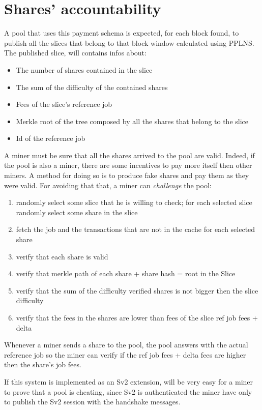 \documentclass[11pt]{article}
\begin{document}
\section{Shares' accountability}
A pool that uses this payment schema is expected, for each block found, to publish all the slices
that belong to that block window calculated using PPLNS. The published slice, will contains infos
about:
\begin{itemize}
	\item The number of shares contained in the slice
	\item The sum of the difficulty of the contained shares
	\item Fees of the slice's reference job
	\item Merkle root of the tree composed by all the shares that belong to the slice
	\item Id of the reference job
\end{itemize}
A miner must be sure that all the shares arrived to the pool are valid. Indeed, if the pool is also a miner, there are some incentives to pay more itself then other miners. A method for doing so is to produce fake shares and pay them as they were valid. For avoiding that that, a miner can \emph{challenge} the pool:
\begin{enumerate}
	\item randomly select some slice that he is willing to check; for each selected slice randomly select some share in the slice
	\item fetch the job and the transactions that are not in the cache for each selected share
	\item verify that each share is valid
	\item verify that merkle path of each share + share hash = root in the Slice
	\item verify that the sum of the difficulty verified shares is not bigger then the slice difficulty
	\item verify that the fees in the shares are lower than fees of the slice ref job fees + delta
	
\end{enumerate}
 
Whenever a miner sends a share to the pool, the pool answers with the actual reference job so the miner can verify if the ref job fees + delta fees are higher then the share's job fees.

If this system is implemented as an Sv2 extension, will be very easy for a miner to prove that a pool is cheating, since Sv2 is authenticated the miner have only to publish the Sv2 session with the handshake messages.
\end{document}

